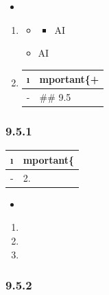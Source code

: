 \begin{itemize}
\item
  \important{}
\end{itemize}

\begin{enumerate}
\def\labelenumi{\arabic{enumi}.}
\item

  \begin{itemize}
  \item
    \begin{itemize}
    \tightlist
    \item
      AI
    \end{itemize}
  \item
    AI
  \end{itemize}
\item
  \begin{longtable}[]{@{}ll@{}}
  \toprule\noalign{}
  \i & mportant\{+} \\
  \midrule\noalign{}
  \endhead
  \bottomrule\noalign{}
  \endlastfoot
  - & \#\# 9.5 \\
  \end{longtable}
\end{enumerate}

\hypertarget{section-16}{%
\subsubsection{9.5.1}\label{section-16}}

\important{}

\begin{longtable}[]{@{}ll@{}}
\toprule\noalign{}
\i & mportant\{} \\
\midrule\noalign{}
\endhead
\bottomrule\noalign{}
\endlastfoot
- & 2. \important{} \\
\end{longtable}

\begin{itemize}
\item
  \important{}
\end{itemize}

\begin{enumerate}
\def\labelenumi{\arabic{enumi}.}
\item
  \important{}
\item
  \important{}
\item
  \important{}
\end{enumerate}

\hypertarget{section-17}{%
\subsubsection{9.5.2}\label{section-17}}

